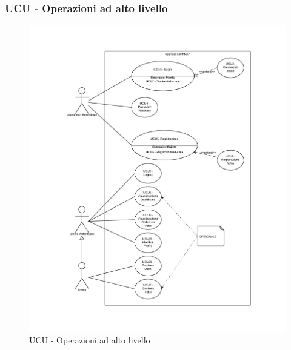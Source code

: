 \subsubsection{UCU - Operazioni ad alto livello} 
    \begin{figure}[H]
      \includegraphics[width=12cm]{UML/UCU - Operazioni ad alto livello.png}
      \caption{UCU - Operazioni ad alto livello} 
    \end{figure}
    
